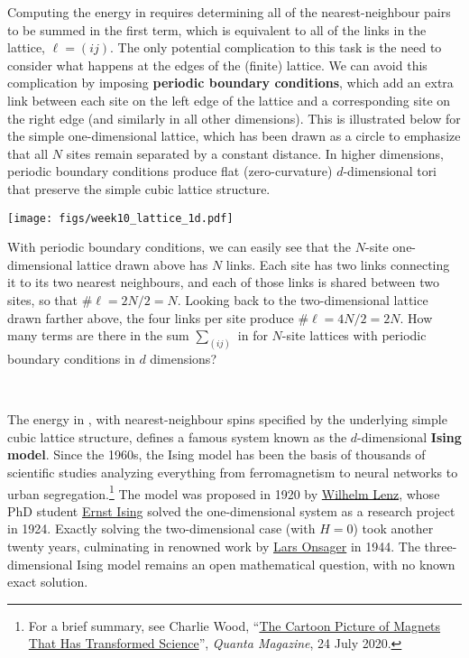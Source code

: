 Computing the energy in  requires determining all of the nearest-neighbour pairs to be summed in the first term, which is equivalent to all of the links in the lattice, $\ell = (ij)$.
The only potential complication to this task is the need to consider what happens at the edges of the (finite) lattice.
We can avoid this complication by imposing \textbf{periodic boundary conditions}, which add an extra link between each site on the left edge of the lattice and a corresponding site on the right edge (and similarly in all other dimensions).
This is illustrated below for the simple one-dimensional lattice, which has been drawn as a circle to emphasize that all $N$ sites remain separated by a constant distance.
In higher dimensions, periodic boundary conditions produce flat (zero-curvature) $d$-dimensional tori that preserve the simple cubic lattice structure.

\begin{center}\texttt{[image: figs/week10\_lattice\_1d.pdf]}\end{center}

With periodic boundary conditions, we can easily see that the $N$-site one-dimensional lattice drawn above has $N$ links.
Each site has two links connecting it to its two nearest neighbours, and each of those links is shared between two sites, so that $\#\ell = 2N / 2 = N$.
Looking back to the two-dimensional lattice drawn farther above, the four links per site produce $\#\ell = 4N / 2 = 2N$.
How many terms are there in the sum $\sum_{(ij)}$ in  for $N$-site lattices with periodic boundary conditions in $d$ dimensions?
\begin{mdframed}
  \ \\[50 pt]
\end{mdframed}

The energy in , with nearest-neighbour spins specified by the underlying simple cubic lattice structure, defines a famous system known as the $d$-dimensional \textbf{Ising model}.
Since the 1960s, the Ising model has been the basis of thousands of scientific studies analyzing everything from ferromagnetism to neural networks to urban segregation.\footnote{For a brief summary, see Charlie Wood, ``\href{https://www.quantamagazine.org/the-cartoon-picture-of-magnets-that-has-transformed-science-20200624/}{The Cartoon Picture of Magnets That Has Transformed Science}'', \textit{Quanta Magazine}, 24 July 2020.}
The model was proposed in 1920 by \href{https://en.wikipedia.org/wiki/Wilhelm_Lenz}{Wilhelm Lenz}, whose PhD student \href{https://en.wikipedia.org/wiki/Ernst_Ising}{Ernst Ising} solved the one-dimensional system as a research project in 1924.
Exactly solving the two-dimensional case (with $H = 0$) took another twenty years, culminating in renowned work by \href{https://en.wikipedia.org/wiki/Lars_Onsager}{Lars Onsager} in 1944.
The three-dimensional Ising model remains an open mathematical question, with no known exact solution.

